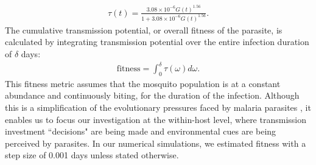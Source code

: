 \documentclass[10pt,letterpaper]{article}
\begin{document}
\begin{eqnarray}
\label{eq:scheme16}
\tau(t) = \frac{3.08 \times 10^{-6}G(t)^ {1.56}}{1+3.08 \times 10^{-6}G(t)^ {1.56}}.
\end{eqnarray}
The cumulative transmission potential, or overall fitness of the parasite, is calculated by integrating transmission potential over the entire infection duration of $\delta$ days: 
\begin{eqnarray}
\label{eq:scheme17}
    \mathrm{fitness} = \int_{0}^{\delta}\tau(\omega)d\omega.
\end{eqnarray}
This fitness metric assumes that the mosquito population is at a constant abundance and continuously biting, for the duration of the infection. Although this is a simplification of the evolutionary pressures faced by malaria parasites \cite{greischar_partitioning_2019}, it enables us to focus our investigation at the within-host level, where transmission investment ``decisions" are being made and environmental cues are being perceived by parasites. In our numerical simulations, we estimated fitness with a step size of 0.001 days unless stated otherwise.
\end{document}
